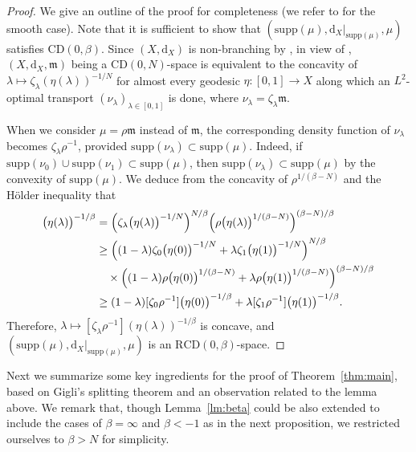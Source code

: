 \documentclass[sts]{imsart}
\theoremstyle{definition}
\theoremstyle{remark}
\newcommand{\fm}{\mathfrak{m}}
\newcommand{\dist}{\mathrm{d}}
\newcommand{\lra}{\longrightarrow}
\newcommand{\CD}{\mathrm{CD}}
\newcommand{\RCD}{\mathrm{RCD}}
\newcommand{\supp}{\mathrm{supp}}
\begin{document}
\begin{proof}
We give an outline of the proof for completeness
(we refer to \cite[Theorem~1.7(ii)]{SturmII} for the smooth case).
Note that it is sufficient to show that $(\supp(\mu),\dist_X|_{\supp(\mu)},\mu)$ satisfies $\CD(0,\beta)$.
Since $(X,\dist_X)$ is non-branching by \cite[Theorem 1.3]{deng2020},
in view of \cite[Proposition~4.2]{SturmII},
$(X,\dist_X,\fm)$ being a $\CD(0,N)$-space is equivalent to the concavity of $\lambda \longmapsto \zeta_\lambda (\eta(\lambda))^{-1/N}$ for almost every geodesic $\eta\colon [0,1] \lra X$ along which an $L^2$-optimal transport $(\nu_\lambda)_{\lambda \in [0,1]}$ is done,
where $\nu_\lambda =\zeta_\lambda \fm$.

When we consider $\mu=\rho\fm$ instead of $\fm$, the corresponding density function of $\nu_\lambda$ becomes $\zeta_\lambda \rho^{-1}$, provided $\supp(\nu_{\lambda}) \subset \supp(\mu)$.
Indeed, if $\supp(\nu_0) \cup \supp(\nu_1) \subset \supp(\mu)$, then $\supp(\nu_{\lambda}) \subset \supp(\mu)$ by the convexity of $\supp(\mu)$.
We deduce from the concavity of $\rho^{1/(\beta -N)}$ and the H\"older inequality that
\begin{align*}
[\zeta_\lambda \rho^{-1}] \bigl( \eta(\lambda) \bigr)^{-1/\beta}
&= \Bigl( \zeta_\lambda \bigl( \eta(\lambda) \bigr)^{-1/N} \Bigr)^{N/\beta}
 \Bigl( \rho\bigl( \eta(\lambda) \bigr)^{1/(\beta -N)} \Bigr)^{(\beta -N)/\beta} \\
&\ge \Bigl( (1-\lambda)\zeta_0 \bigl( \eta(0) \bigr)^{-1/N} +\lambda\zeta_1 \bigl( \eta(1) \bigr)^{-1/N} \Bigr)^{N/\beta} \\
&\quad\times \Bigl( (1-\lambda)\rho\bigl( \eta(0) \bigr)^{1/(\beta -N)} +\lambda\rho\bigl( \eta(1) \bigr)^{1/(\beta -N)} \Bigr)^{(\beta -N)/\beta} \\
&\ge (1-\lambda)[\zeta_0 \rho^{-1}] \bigl( \eta(0) \bigr)^{-1/\beta}
 +\lambda[\zeta_1 \rho^{-1}] \bigl( \eta(1) \bigr)^{-1/\beta}.
\end{align*}
Therefore, $\lambda \longmapsto [\zeta_\lambda \rho^{-1}](\eta(\lambda))^{-1/\beta}$ is concave, and $(\supp(\mu),\dist_X|_{\supp(\mu)},\mu)$ is an $\RCD(0,\beta)$-space.
\end{proof}

Next we summarize some key ingredients for the proof of Theorem~\ref{thm:main}, based on Gigli's splitting theorem and an observation related to the lemma above.
We remark that, though Lemma~\ref{lm:beta} could be also extended to include the cases of $\beta=\infty$ and $\beta<-1$ as in the next proposition, we restricted ourselves to $\beta>N$ for simplicity.
\end{document}
